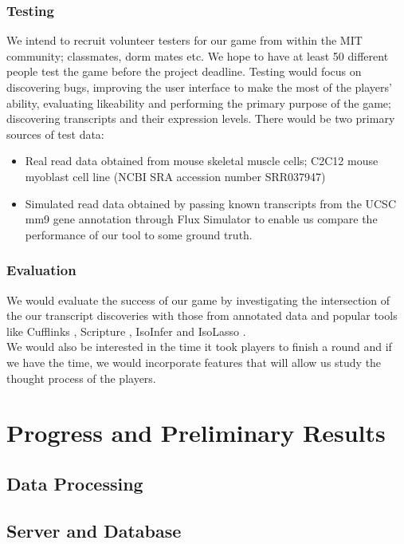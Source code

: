 \documentclass[12pt]{article}
\begin{document}
\subsubsection*{Testing}
We intend to recruit volunteer testers for our game from within the MIT community; classmates, dorm mates etc. We hope to have at least 50 different people test the game before the project deadline. Testing would focus on discovering bugs, improving the user interface to make the most of the players' ability, evaluating likeability and performing the primary purpose of the game; discovering transcripts and their expression levels. There would be two primary sources of test data:
\begin{itemize}
\item Real read data obtained from mouse skeletal muscle cells; C2C12 mouse myoblast cell line (NCBI SRA accession number SRR037947) \citep{trapnell2010transcript}
\item Simulated read data obtained by passing known transcripts from the UCSC mm9 gene annotation \citep{karolchik2008ucsc} through Flux Simulator \citep{sammeth2010flux} to enable us compare the performance of our tool to some ground truth.
\end{itemize}
\subsubsection*{Evaluation}
We would evaluate the success of our game by investigating the intersection of the our transcript discoveries with those from annotated data and popular tools like Cufflinks \citep{trapnell2010transcript}, Scripture \citep{guttman2010ab} , IsoInfer \citep{feng2010inference} and IsoLasso \citep{li2011isolasso}. \\
We would also be interested in the time it took players to finish a round and if we have the time, we would incorporate features that will allow us study the thought process of the players.

\section*{Progress and Preliminary Results}

\subsection*{Data Processing}

\subsection*{Server and Database}
\end{document}
